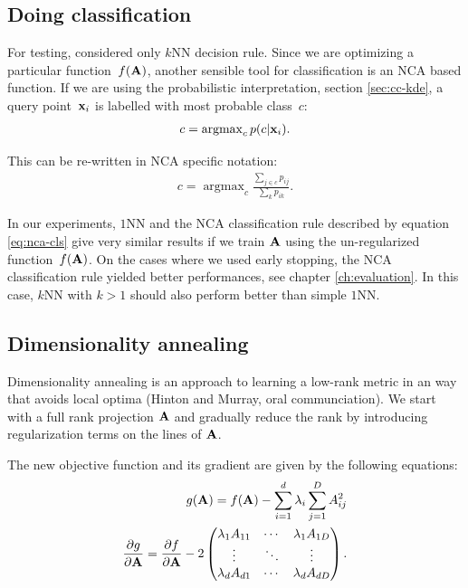 \subsection{Doing classification}
\label{subsec:doing-classification}

  For testing, \citet{goldberger2004} considered only $k$NN decision rule. Since we are optimizing a particular function~$f(\mathbf{A})$, another sensible tool for classification is an NCA based function. If we are using the probabilistic interpretation, section \ref{sec:cc-kde}, a query point~$\mathbf{x}_i$ is labelled with most probable class~$c$:
  \begin{align}
     c = \operatorname{argmax}_cp(c|\mathbf{x}_i).
  \end{align}

  This can be re-written in NCA specific notation:
  \begin{align}
    c = \operatorname{argmax}_c\frac{\sum_{j\in c}p_{ij}}{\sum_k p_{ik}}.
    \label{eq:nca-cls}
  \end{align}

  In our experiments, $1$NN and the NCA classification rule described by equation \eqref{eq:nca-cls} give very similar results if we train $\mathbf{A}$ using the un-regularized function~$f(\mathbf{A})$. On the cases where we used early stopping, the NCA classification rule yielded better performances, see chapter \ref{ch:evaluation}. In this case, $k$NN with $k>1$ should also perform better than simple $1$NN.

\subsection{Dimensionality annealing}
\label{subsec:dimensionality-annealing}

  Dimensionality annealing is an approach to learning a low-rank metric in an way that avoids local optima (Hinton and Murray, oral communciation). We start with a full rank projection $\mathbf{A}$ and gradually reduce the rank by introducing regularization terms on the lines of $\mathbf{A}$.

   The new objective function and its gradient are given by the following equations:
    \begin{align}
            g(\mathbf{A}) = f(\mathbf{A}) - \sum_{i=1}^d\lambda_i\sum_{j=1}^D A_{ij}^2\\
            \frac{\partial g}{\partial \mathbf{A}} = \frac{\partial f}{\partial \mathbf{A}} - 2\begin{pmatrix}
                              \lambda_1A_{11} &  \cdots & \lambda_1A_{1D} \\
                              \vdots  &   \ddots & \vdots  \\
                              \lambda_dA_{d1} & \cdots & \lambda_dA_{dD}
                             \end{pmatrix}.
     \end{align}

